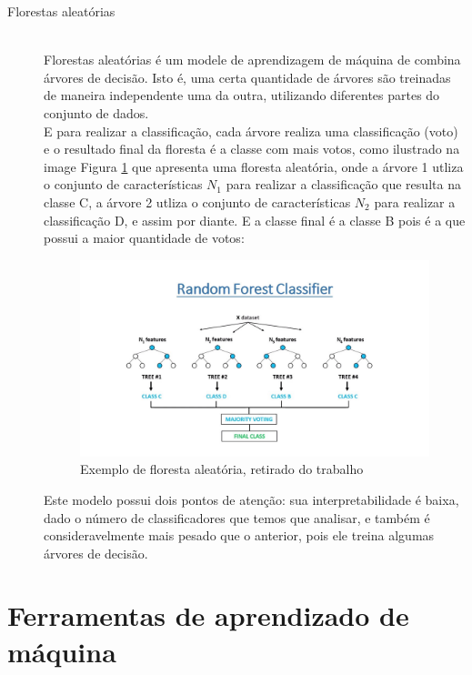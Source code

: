 \begin{description}
    \item[Florestas aleatórias] \hfill \\ Florestas aleatórias é um modele de aprendizagem 
    de máquina de combina árvores de decisão. Isto é, uma certa quantidade de árvores são 
    treinadas de maneira independente uma da outra, utilizando diferentes partes do conjunto de 
    dados. \\ 
    E para realizar a classificação, cada árvore realiza uma classificação (voto) e o resultado 
    final da floresta é a classe com mais votos, como ilustrado na image Figura \ref{fig:ex_random_forest}
    que apresenta uma floresta aleatória, onde a árvore 1 utliza o conjunto de características $N_1$ 
    para realizar a classificação que resulta na classe C, a árvore 2 utliza o conjunto de características $N_2$ 
    para realizar a classificação D, e assim por diante. E a classe final é a classe B pois é a que 
    possui a maior quantidade de votos: \\

    \begin{figure}
        \centering
        \includegraphics[width=.9\textwidth]{figuras/ex_random_forest.jpg}
        \caption{Exemplo de floresta aleatória, retirado do trabalho \cite{ref:imagem_random_forest} \label{fig:ex_random_forest}}
    \end{figure}

    Este modelo possui dois pontos de atenção: sua interpretabilidade é baixa, dado o número de 
    classificadores que temos que analisar, e também é consideravelmente mais pesado que o anterior, 
    pois ele treina algumas árvores de decisão.
\end{description}

\section{Ferramentas de aprendizado de máquina}

